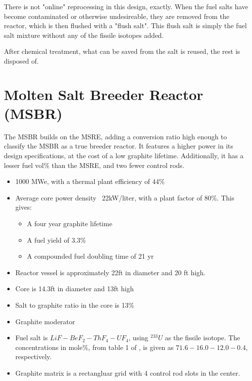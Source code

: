 \documentclass[letterpaper]{article}
\begin{document}
There is not "online" reprocessing in this design, exactly.  When the fuel salts have become contaminated or otherwise undesireable, they are removed from the reactor, which is then flushed with a "flush salt".  This flush salt is simply the fuel salt mixture without any of the fissile isotopes added.

After chemical treatment, what can be saved from the salt is reused, the rest is disposed of.

\section{Molten Salt Breeder Reactor (MSBR)}
The MSBR builds on the MSRE, adding a conversion ratio high enough to classify the MSBR as a true breeder reactor.  It features a higher power in its design specifications, at the cost of a low graphite lifetime.  Additionally, it has a lesser fuel vol\% than the MSRE, and two fewer control rods.

\begin{itemize}
\item 1000 MWe, with a thermal plant efficiency of 44\%
\item Average core power density ~22kW/liter, with a plant factor of 80\%.  This gives:
	\begin{itemize}
	\item A four year graphite lifetime
	\item A fuel yield of 3.3\%
	\item A compounded fuel doubling time of 21 yr
	\end{itemize}
\item Reactor vessel is approximately 22ft in diameter and 20 ft high.
\item Core is 14.3ft in diameter and 13ft high
\item Salt to graphite ratio in the core is 13\%
\item Graphite moderator
\item Fuel salt is $LiF - BeF_2 - ThF_4 - UF_4$, using ${}^{233}U$ as the fissile isotope.  The concentrations in mole\%, from table 1 of \cite{bettis_design_1970}, is given as $71.6 - 16.0 - 12.0 - 0.4$, respectively.
\item Graphite matrix is a rectangluar grid with 4 control rod slots in the center.
\end{itemize}
\end{document}
